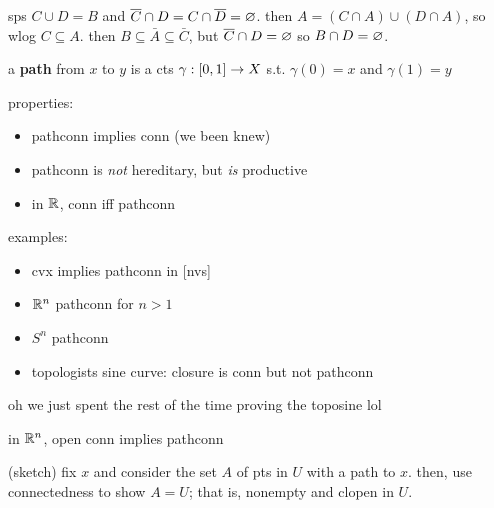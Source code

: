 \begin{pf}[source=Primary Source Material]
    sps $C\cup D=B$ and $\overline{C}\cap D=C\cap\overline{D}=\varnothing$.
    then $A=(C\cap A)\cup(D\cap A)$, so wlog $C\subseteq A$.
    then $B\subseteq\bar{A}\subseteq\bar{C}$, but $\overline{C}\cap D=\varnothing$
    so $B\cap D=\varnothing$.
\end{pf}


\begin{defn}
    a \textbf{path} from $x$ to $y$ is a cts $\gamma:[0,1]\rightarrow X$ s.t.
    $\gamma(0)=x$ and $\gamma(1)=y$
\end{defn}
properties:
\begin{itemize}[topsep=-0.75ex]
    \item pathconn implies conn (we been knew)
    \item pathconn is \textit{not} hereditary, but \textit{is} productive
    \item in $\mathbb{R}$, conn iff pathconn
\end{itemize}
examples:
\begin{itemize}[topsep=-0.75ex]
    \item cvx implies pathconn in [nvs]
    \item $\mathbb{R}^{n}$ pathconn for $n>1$
    \item $S^{n}$ pathconn
    \item topologists sine curve: closure is conn but not pathconn
\end{itemize}
oh we just spent the rest of the time proving the toposine lol

\begin{prop}
    in $\mathbb{R}^{n}$, open conn implies pathconn
\end{prop}

\begin{pf}[source=Primary Source Material]
    (sketch) fix $x$ and consider the set $A$ of pts in $U$ with a path to $x$.
    then, use connectedness to show $A=U$; that is, nonempty and clopen in $U$.
\end{pf}
